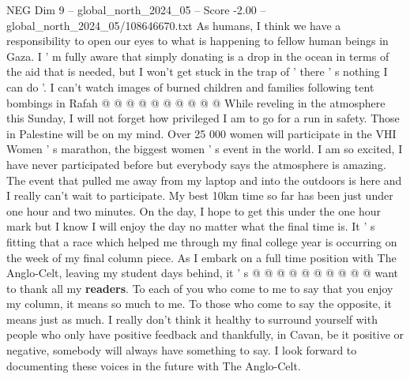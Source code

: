 \begin{textsample}{NEG Dim 9 – global\_north\_2024\_05 – Score -2.00 – global\_north\_2024\_05/108646670.txt}
As humans, I think we have a responsibility to open our eyes to what is happening to fellow human beings in Gaza.
I ' m fully aware that simply donating is a drop in the ocean in terms of the aid that is needed, but I won't get stuck in the trap of ' there ' s nothing I can do '.
I can't watch images of burned children and families following tent bombings in Rafah @ @ @ @ @ @ @ @ @ @ While reveling in the atmosphere this Sunday, I will not forget how privileged I am to go for a run in safety.
Those in Palestine will be on my mind.
Over 25 000 women will participate in the VHI Women ' s marathon, the biggest women ' s event in the world.
I am so excited, I have never participated before but everybody says the atmosphere is amazing.
The event that pulled me away from my laptop and into the outdoors is here and I really can't wait to participate.
My best 10km time so far has been just under one hour and two minutes.
On the day, I hope to get this under the one hour mark but I know I will enjoy the day no matter what the final time is.
It ' s fitting that a race which helped me through my final college year is occurring on the week of my final column piece.
As I embark on a full time position with The Anglo-Celt, leaving my student days behind, it ' s @ @ @ @ @ @ @ @ @ @ want to thank all my \textbf{readers}.
To each of you who come to me to say that you enjoy my column, it means so much to me.
To those who come to say the opposite, it means just as much.
I really don't think it healthy to surround yourself with people who only have positive feedback and thankfully, in Cavan, be it positive or negative, somebody will always have something to say.
I look forward to documenting these voices in the future with The Anglo-Celt.

\end{textsample}
